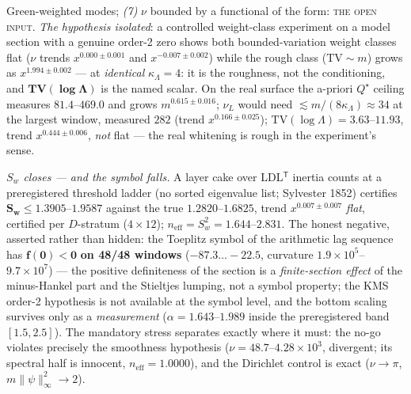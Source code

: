 \documentclass[11pt,a4paper]{article}
\begin{document}
Green-weighted modes; \emph{(7)} $\nu$ bounded by a functional of the form: \textsc{the open
input}. \emph{The hypothesis isolated}: a controlled weight-class experiment on a model section
with a genuine order-2 zero shows both bounded-variation weight classes flat ($\nu$ trends
$x^{0.000\pm0.001}$ and $x^{-0.007\pm0.002}$) while the rough class ($\mathrm{TV}\sim m$) grows
as $x^{1.994\pm0.002}$ --- at \emph{identical} $\kappa_\Lambda=4$: it is the roughness, not the
conditioning, and $\mathbf{TV(\log\Lambda)}$ is the named scalar. On the real surface the
a-priori $Q^\star$ ceiling measures $81.4$--$469.0$ and grows $m^{0.615\pm0.016}$; $\nu_L$
would need $\lesssim m/(8\kappa_\Lambda)\approx34$ at the largest window, measured $282$
(trend $x^{0.166\pm0.025}$); $\mathrm{TV}(\log\Lambda)=3.63$--$11.93$, trend
$x^{0.444\pm0.006}$, \emph{not} flat --- the real whitening is rough in the experiment's sense.

\emph{$S_w$ closes --- and the symbol falls.} A layer cake over LDL$^{\mathsf T}$ inertia counts
at a preregistered threshold ladder (no sorted eigenvalue list; Sylvester 1852) certifies
$\mathbf{S_w\le1.3905}$--$\mathbf{1.9587}$ against the true $1.2820$--$1.6825$, trend
$x^{0.007\pm0.007}$ \emph{flat}, certified per $D$-stratum ($4\times12$);
$n_{\mathrm{eff}}=S_w^2=1.644$--$2.831$. The honest negative, asserted rather than hidden: the
Toeplitz symbol of the arithmetic lag sequence has $\mathbf{f(0)<0}$ \textbf{on 48/48 windows}
($-87.3\ldots-22.5$, curvature $1.9\times10^{5}$--$9.7\times10^{7}$) --- the positive
definiteness of the section is a \emph{finite-section effect} of the minus-Hankel part and the
Stieltjes lumping, not a symbol property; the KMS order-2 hypothesis is not available at the
symbol level, and the bottom scaling survives only as a \emph{measurement}
($\alpha=1.643$--$1.989$ inside the preregistered band $[1.5,2.5]$). The mandatory stress
separates exactly where it must: the no-go violates precisely the smoothness hypothesis
($\nu=48.7$--$4.28\times10^{3}$, divergent; its spectral half is innocent,
$n_{\mathrm{eff}}=1.0000$), and the Dirichlet control is exact ($\nu\to\pi$,
$m\|\psi\|_\infty^2\to2$).
\end{document}

